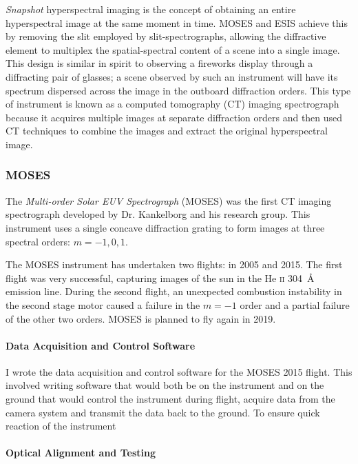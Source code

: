 \documentclass[10pt,letterpaper]{article}
\begin{document}
			\textit{Snapshot} hyperspectral imaging is the concept of obtaining an entire hyperspectral image at the same moment in time. MOSES and ESIS achieve this by removing the slit employed by slit-spectrographs, allowing the diffractive element to multiplex the spatial-spectral content of a scene into a single image. This design is similar in spirit to observing a fireworks display through a diffracting pair of glasses; a scene observed by such an instrument will have its spectrum dispersed across the image in the outboard diffraction orders. This type of instrument is known as a computed tomography (CT) imaging spectrograph because it acquires multiple images at separate diffraction orders and then used CT techniques to combine the images and extract the original hyperspectral image.
			
					
			\subsubsection{MOSES}
			
				The \textit{Multi-order Solar EUV Spectrograph} (MOSES) was the first CT imaging spectrograph developed by Dr. Kankelborg and his research group. This instrument uses a single concave diffraction grating to form images at three spectral orders: $m=-1,0,1$.
				
				The MOSES instrument has undertaken two flights: in 2005 and 2015. The first flight was very successful, capturing images of the sun in the He \textsc{ii} \SI{304}{\angstrom} emission line. During the second flight, an unexpected combustion instability in the second stage motor caused a failure in the $m=-1$ order and a partial failure of the other two orders. MOSES is planned to fly again in 2019.
			
				\paragraph{Data Acquisition and Control Software}
				
					I wrote the data acquisition and control software for the MOSES 2015 flight. This involved writing software that would both be on the instrument and on the ground that would control the instrument during flight, acquire data from the camera system and transmit the data back to the ground. To ensure quick reaction of the instrument
				
				\paragraph{Optical Alignment and Testing}
\end{document}
